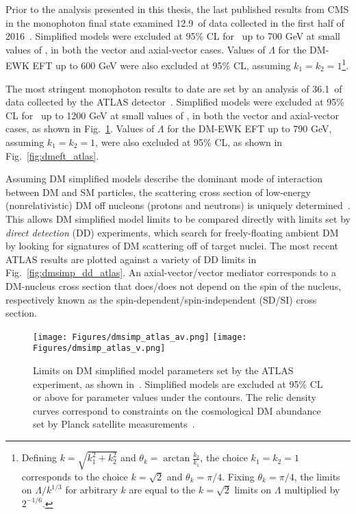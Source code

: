 Prior to the analysis presented in this thesis, the last published results from CMS in the monophoton final state examined 12.9\fbinv\ of data collected in the first half
of 2016~\cite{ref:JHEP10(2017)073}. Simplified models were excluded at 95\% CL for \mmed\ up to 700 GeV at small values of \mdm, in both the vector
and axial-vector cases. Values of $\Lambda$ for the DM-EWK EFT up to 600 GeV were also excluded at 95\% CL, assuming $k_{1} = k_{2} = 1$\footnote{Defining $k = \sqrt{k_{1}^{2} + k_{2}^{2}}$
and $\theta_{k} = \arctan{\frac{k_{2}}{k_{1}}}$, the choice $k_{1} = k_{2} = 1$ corresponds to the choice $k = \sqrt{2}$ and $\theta_{k} = \pi/4$. Fixing $\theta_{k} = \pi/4$,
the limits on $\Lambda / k^{1/3}$ for arbitrary $k$ are equal to the $k = \sqrt{2}$ limits on $\Lambda$ multiplied by $2^{-1/6}$.}.

The most stringent monophoton results to date are set by an analysis of 36.1\fbinv\ of data collected by the ATLAS detector~\cite{ref:epjc/s10052-017-4965-8}.
Simplified models were excluded at 95\% CL for \mmed\ up to 1200 GeV at small values of \mdm, in both the vector and axial-vector cases, as shown in Fig.~\ref{fig:dmsimp_atlas}.
Values of $\Lambda$ for the DM-EWK EFT up to 790 GeV, assuming $k_{1} = k_{2} = 1$, were also excluded at 95\% CL, as shown in Fig.~\ref{fig:dmeft_atlas}.

Assuming DM simplified models describe the dominant mode of interaction between DM and SM particles, the scattering cross section of low-energy (nonrelativistic) DM off nucleons (protons and neutrons)
is uniquely determined~\cite{ref:1603.04156}. This allows DM simplified model limits to be compared directly with limits set by \textit{direct detection} (DD) experiments, which search for freely-floating
ambient DM by looking for signatures of DM scattering off of target nuclei.
The most recent ATLAS results are plotted against a variety of DD limits in Fig.~\ref{fig:dmsimp_dd_atlas}. An axial-vector/vector mediator corresponds to a DM-nucleus cross section
that does/does not depend on the spin of the nucleus, respectively known as the spin-dependent/spin-independent (SD/SI) cross section.

\begin{figure}[hbtb]
  \begin{center}
    \texttt{[image: Figures/dmsimp\_atlas\_av.png]}
    \texttt{[image: Figures/dmsimp\_atlas\_v.png]}
    \caption{Limits on DM simplified model parameters set by the ATLAS experiment, as shown in~\cite{ref:epjc/s10052-017-4965-8}. Simplified models are excluded at 95\% CL or above
    for parameter values under the contours. The relic density curves correspond to constraints on the cosmological DM abundance set by Planck satellite measurements~\cite{ref:planck2018_cosparams}.
    }
    \label{fig:dmsimp_atlas}
  \end{center}
\end{figure}

